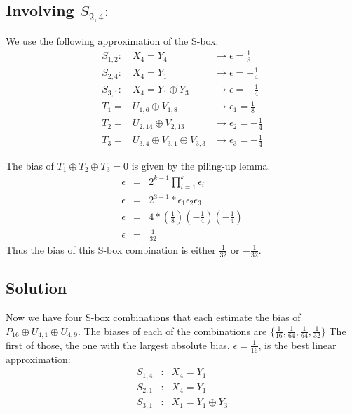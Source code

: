 \documentclass{elsart}
\begin{document}
\subsection{Involving $S_{2,4}:$}
We use the following approximation of the S-box:
\begin{eqnarray*}
S_{1,2}: &X_{4}=Y_{4} &\rightarrow \epsilon=\frac{1}{8} \\
S_{2,4}: &X_{4}=Y_{1} &\rightarrow \epsilon=-\frac{1}{4} \\
S_{3,1}: &X_{4}=Y_{1} \oplus Y_{3} &\rightarrow \epsilon=-\frac{1}{4} \\
T_{1} = &U_{1,6} \oplus V_{1,8} &\rightarrow \epsilon_{1}=\frac{1}{8} \\
T_{2} = &U_{2,14} \oplus V_{2,13} &\rightarrow \epsilon_{2}=-\frac{1}{4} \\
T_{3} = &U_{3,4} \oplus V_{3,1} \oplus V_{3,3}
  &\rightarrow \epsilon_{3}=-\frac{1}{4}
\end{eqnarray*}

The bias of $T_{1} \oplus T_{2} \oplus T_{3} = 0$ is given by the 
piling-up lemma.
\begin{eqnarray*}
  \epsilon &=& 2^{k-1} \displaystyle\prod_{i=1}^k \epsilon_{i} \\
  \epsilon &=& 2^{3-1} * \epsilon_{1}\epsilon_{2}\epsilon_{3} \\
  \epsilon &=& 4 * (\frac{1}{8})(-\frac{1}{4})(-\frac{1}{4}) \\
  \epsilon &=& \frac{1}{32}
\end{eqnarray*}
Thus the bias of this S-box combination is either $\frac{1}{32}$ 
or $-\frac{1}{32}$.

\subsection{Solution}

Now we have four S-box combinations that each estimate the bias of 
$P_{16} \oplus U_{4,1} \oplus U_{4,9}$.  The biases of each of the 
combinations are $\lbrace \frac{1}{16}, \frac{1}{64}, \frac{1}{64}, 
             \frac{1}{32} \rbrace$
The first of those, the one with the largest absolute bias, 
    $\epsilon = \frac{1}{16}$, is the best linear approximation:
\begin{eqnarray*}
S_{1,4}&: &X_{4}=Y_{1} \\
S_{2,1}&: &X_{4}=Y_{1} \\
S_{3,1}&: &X_{1}=Y_{1} \oplus Y_{3} 
\end{eqnarray*}
\end{document}

